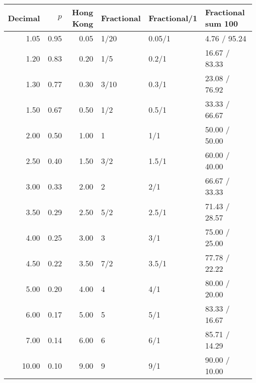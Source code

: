 \begin{longtable}{rrrlll}
  \hline
Decimal & $p$ & Hong Kong & Fractional & Fractional/1 & Fractional sum 100 \\ 
  \hline
1.05 & 0.95 & 0.05 & 1/20 & 0.05/1 &  4.76 / 95.24 \\ 
  1.20 & 0.83 & 0.20 & 1/5 & 0.2/1 & 16.67 / 83.33 \\ 
  1.30 & 0.77 & 0.30 & 3/10 & 0.3/1 & 23.08 / 76.92 \\ 
  1.50 & 0.67 & 0.50 & 1/2 & 0.5/1 & 33.33 / 66.67 \\ 
  2.00 & 0.50 & 1.00 & 1 & 1/1 & 50.00 / 50.00 \\ 
  2.50 & 0.40 & 1.50 & 3/2 & 1.5/1 & 60.00 / 40.00 \\ 
  3.00 & 0.33 & 2.00 & 2 & 2/1 & 66.67 / 33.33 \\ 
  3.50 & 0.29 & 2.50 & 5/2 & 2.5/1 & 71.43 / 28.57 \\ 
  4.00 & 0.25 & 3.00 & 3 & 3/1 & 75.00 / 25.00 \\ 
  4.50 & 0.22 & 3.50 & 7/2 & 3.5/1 & 77.78 / 22.22 \\ 
  5.00 & 0.20 & 4.00 & 4 & 4/1 & 80.00 / 20.00 \\ 
  6.00 & 0.17 & 5.00 & 5 & 5/1 & 83.33 / 16.67 \\ 
  7.00 & 0.14 & 6.00 & 6 & 6/1 & 85.71 / 14.29 \\ 
  10.00 & 0.10 & 9.00 & 9 & 9/1 & 90.00 / 10.00 \\ 
   \hline
\hline
\end{longtable}
